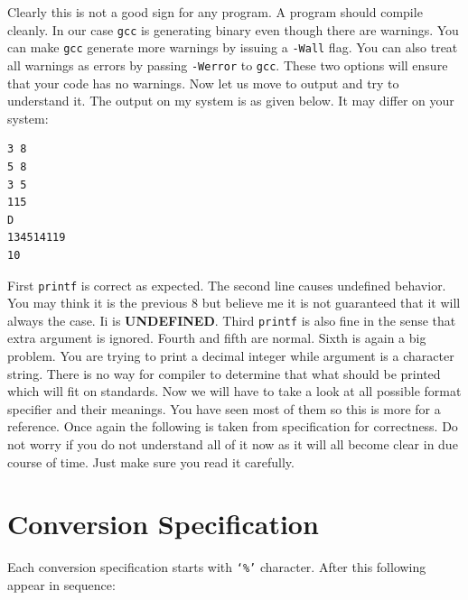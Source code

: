 Clearly this is not a good sign for any program. A program should compile
cleanly. In our case \texttt{gcc} is generating binary even though there are
warnings. You can make \texttt{gcc} generate more warnings by issuing a
\texttt{-Wall} flag. You can also treat all warnings as errors by passing
\texttt{-Werror} to \texttt{gcc}. These two options will ensure that your code
has no warnings. Now let us move to output and try to understand it. The output
on my system is as given below. It may differ on your system:

\begin{verbatim}
3 8
5 8
3 5
115
D
134514119
10
\end{verbatim}

First \texttt{printf} is correct as expected. The second line causes undefined
behavior. You may think it is the previous 8 but believe me it is not
guaranteed that it will always the case. Ii is \textbf{UNDEFINED}. Third
\texttt{printf} is also fine in the sense that extra argument is
ignored. Fourth and fifth are normal. Sixth is again a big problem. You are
trying to print a decimal integer while argument is a character string. There
is no way for compiler to determine that what should be printed which will fit
on standards. Now we will have to take a look at all possible format specifier
and their meanings. You have seen most of them so this is more for a
reference. Once again the following is taken from specification for
correctness. Do not worry if you do not understand all of it now as it will all
become clear in due course of time. Just make sure you read it carefully.

\section{Conversion Specification}
Each conversion specification starts with \texttt{`\%'} character. After this
following appear in sequence:

